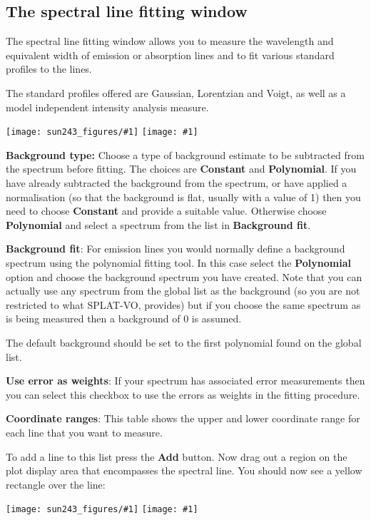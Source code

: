 \documentclass[twoside,11pt,nolof]{starlink}
\providecommand{\SPLAT}{\textsf{SPLAT-VO}}
\providecommand{\mainfigure}[1]
{\begin{center}
    \ifpdf
    \texttt{[image: sun243\_figures/\#1]}
    \else
    \texttt{[image: \#1]}
    \fi
 \end{center}
}
\newcommand{\labelitem}[1]{\textbf{#1}}
\begin{document}
\newpage
\subsection{The spectral line fitting window}

The spectral line fitting window allows you to measure the wavelength
and equivalent width of emission or absorption lines and to fit
various standard profiles to the lines.

The standard profiles offered are Gaussian, Lorentzian and Voigt, as
well as a model independent intensity analysis measure.

\mainfigure{linefitwindow}

\labelitem{Background type:} Choose a type of background estimate to
be subtracted from the spectrum before fitting. The choices are
\labelitem{Constant} and \labelitem{Polynomial}. If you have already
subtracted the background from the spectrum, or have applied a
normalisation (so that the background is flat, usually with a value of
1) then you need to choose \labelitem{Constant} and provide a suitable
value. Otherwise choose \labelitem{Polynomial} and select a spectrum
from the list in \labelitem{Background fit}.

\labelitem{Background fit}: For emission lines you would normally
define a background spectrum using the polynomial fitting tool. In
this case select the \labelitem{Polynomial} option and choose the
background spectrum you have created. Note that you can actually use
any spectrum from the global list as the background (so you are not
restricted to what \SPLAT, provides) but if you choose the same
spectrum as is being measured then a background of $0$ is assumed.

The default background should be set to the first polynomial found on
the global list.

\labelitem{Use error as weights}: If your spectrum has associated
error measurements then you can select this checkbox to use the errors
as weights in the fitting procedure.

\labelitem{Coordinate ranges}: This table shows the upper and lower
coordinate range for each line that you want to measure.

To add a line to this list press the \labelitem{Add} button. Now drag
out a region on the plot display area that encompasses the spectral
line. You should now see a yellow rectangle over the line:

\mainfigure{linefitplotwindow}
\end{document}
